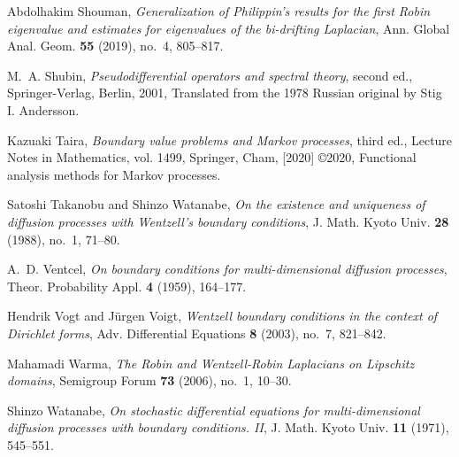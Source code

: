 \documentclass[a4paper]{article}
\theoremstyle{definition}
\numberwithin{equation}{section}
\begin{document}
\begin{thebibliography}{10}
Abdolhakim Shouman, \emph{Generalization of {P}hilippin's results for the first
  {R}obin eigenvalue and estimates for eigenvalues of the bi-drifting
  {L}aplacian}, Ann. Global Anal. Geom. \textbf{55} (2019), no.~4, 805--817.

M.~A. Shubin, \emph{Pseudodifferential operators and spectral theory}, second
  ed., Springer-Verlag, Berlin, 2001, Translated from the 1978 Russian original
  by Stig I. Andersson. 

Kazuaki Taira, \emph{Boundary value problems and {M}arkov processes}, third
  ed., Lecture Notes in Mathematics, vol. 1499, Springer, Cham, [2020]
  \copyright 2020, Functional analysis methods for Markov processes.

Satoshi Takanobu and Shinzo Watanabe, \emph{On the existence and uniqueness of
  diffusion processes with {W}entzell's boundary conditions}, J. Math. Kyoto
  Univ. \textbf{28} (1988), no.~1, 71--80. 

A.~D. Ventcel, \emph{On boundary conditions for multi-dimensional diffusion
  processes}, Theor. Probability Appl. \textbf{4} (1959), 164--177. 

Hendrik Vogt and J\"{u}rgen Voigt, \emph{Wentzell boundary conditions in the
  context of {D}irichlet forms}, Adv. Differential Equations \textbf{8} (2003),
  no.~7, 821--842. 

Mahamadi Warma, \emph{The {R}obin and {W}entzell-{R}obin {L}aplacians on
  {L}ipschitz domains}, Semigroup Forum \textbf{73} (2006), no.~1, 10--30.

Shinzo Watanabe, \emph{On stochastic differential equations for
  multi-dimensional diffusion processes with boundary conditions. {II}}, J.
  Math. Kyoto Univ. \textbf{11} (1971), 545--551. 

\end{thebibliography}
\end{document}
